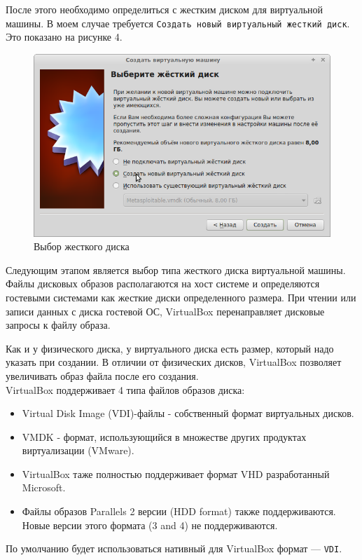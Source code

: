 \documentclass[12pt,a4paper]{article}
\begin{document}
После этого необходимо определиться с жестким диском для виртуальной машины. В моем случае требуется \verb+Создать новый виртуальный жесткий диск+. Это показано на рисунке 4.
\begin{figure}[h!]
\centering
\includegraphics[scale=0.5]{res/ROM}
\caption{Выбор жесткого диска}
\end{figure}

Следующим этапом является выбор типа жесткого диска виртуальной машины.
Файлы дисковых образов располагаются на хост системе и определяются гостевыми системами как жесткие диски определенного размера. При чтении или записи данных с диска гостевой ОС, VirtualBox перенаправляет дисковые запросы к файлу образа.

Как и у физического диска, у виртуального диска есть размер, который надо указать при создании. В отличии от физических дисков, VirtualBox позволяет увеличивать образ файла после его создания.\\
VirtualBox поддерживает 4 типа файлов образов диска:
\begin{itemize}
\item Virtual Disk Image (VDI)-файлы - собственный формат виртуальных дисков. 
\item VMDK - формат, использующийся в множестве других продуктах виртуализации (VMware).
\item VirtualBox таже полностью поддерживает формат VHD разработанный Microsoft.
\item Файлы образов Parallels 2 версии (HDD format) также поддерживаются. Новые версии этого формата (3 and 4) не поддерживаются.
\end{itemize}

По умолчанию будет использоваться нативный для VirtualBox формат — \verb+VDI+.
\end{document}
